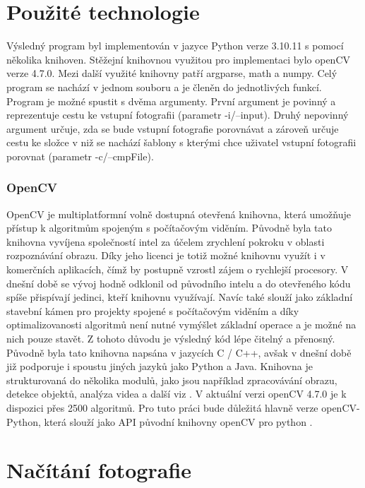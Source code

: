 \section{Použité technologie}
Výsledný program byl implementován v jazyce Python verze 3.10.11 s pomocí několika knihoven. Stěžejní knihovnou využitou pro implementaci bylo openCV verze 4.7.0. Mezi další využité knihovny patří argparse, math a numpy. Celý program se nachází v jednom souboru a je členěn do jednotlivých funkcí. Program je možné spustit s dvěma argumenty. První argument je povinný a reprezentuje cestu ke vstupní fotografii (parametr -i/--input). Druhý nepovinný argument určuje, zda se bude vstupní fotografie porovnávat a zároveň určuje cestu ke složce v niž se nachází šablony s kterými chce uživatel vstupní fotografii porovnat (parametr -c/--cmpFile).

\subsubsection{OpenCV}
OpenCV je multiplatformní volně dostupná otevřená knihovna, která umožňuje přístup k algoritmům spojeným s počítačovým viděním. Původně byla tato knihovna vyvíjena společností intel za účelem zrychlení pokroku v oblasti rozpoznávání obrazu. Díky jeho licenci je totiž možné knihovnu využít i v komerčních aplikacích, čímž by postupně vzrostl zájem o rychlejší procesory. V dnešní době se vývoj hodně odklonil od původního intelu a do otevřeného kódu spíše přispívají jedinci, kteří knihovnu využívají. Navíc také slouží jako základní stavební kámen pro projekty spojené s počítačovým viděním a díky optimalizovanosti algoritmů není nutné vymýšlet základní operace a je možné na nich pouze stavět. Z tohoto důvodu je výsledný kód lépe čitelný a přenosný. Původně byla tato knihovna napsána v jazycích C / C++, avšak v dnešní době již podporuje i spoustu jiných jazyků jako Python a Java. Knihovna je strukturovaná do několika modulů, jako jsou například zpracovávání obrazu, detekce objektů, analýza videa a další viz \cite{opencv_doc}. V aktuální verzi openCV 4.7.0 je k dispozici přes 2500 algoritmů. Pro tuto práci bude důležitá hlavně verze openCV-Python, která slouží jako API původní knihovny openCV pro python \cite{openCV}.



\section{Načítání fotografie}

